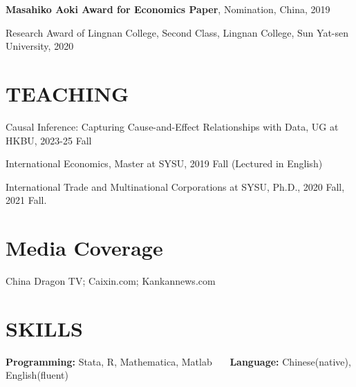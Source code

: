 \documentclass{res}
\begin{document}
\begin{resume}
\textbf{Masahiko Aoki Award for Economics Paper}, Nomination, China, 2019  \\
 \vspace{-1.6em}

Research Award of Lingnan College, Second Class, Lingnan College, Sun Yat-sen University, 2020
 
\section{TEACHING}    
 \vspace{0.8em}   
 
 Causal Inference: Capturing Cause-and-Effect Relationships with Data, UG at HKBU, 2023-25 Fall \\
   \vspace{-1.8em}  
   
International Economics, Master at SYSU, 2019 Fall (Lectured in English)\\
 \vspace{-1.8em}

International Trade and Multinational Corporations at SYSU, Ph.D., 2020 Fall, 2021 Fall.


 
  \section{Media Coverage}
  \vspace{0.8em}   
China Dragon TV; Caixin.com;  Kankannews.com

 
 \section{SKILLS}      
 \vspace{0.8em}   
 
 \address{\\\textbf{Programming:} Stata, R, Mathematica, Matlab}
\address{\\ \textbf{Language:} Chinese(native), English(fluent) }

    
 \textbf{Programming:} Stata, R, Mathematica, Matlab \ \ \ \textbf{Language:} Chinese(native), English(fluent) 
 \vspace{-1.6em}





 
  
 

\end{resume}
\end{document}
